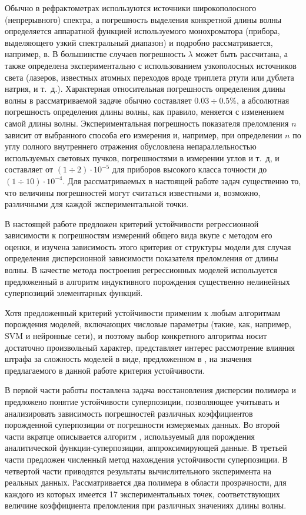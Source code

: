 \documentclass[11pt,a4paper]{article}
\theoremstyle{definition}
\begin{document}
Обычно в рефрактометрах используются источники широкополосного (непрерывного)
спектра, а погрешность выделения конкретной длины волны определяется аппаратной
функцией используемого монохроматора (прибора, выделяющего узкий спектральный
диапазон) и подробно рассматривается, например, в\cite{Malishev79,Zaidel72}.
В большинстве случаев погрешность $\lambda$ может быть рассчитана, а также
определена экспериментально с использованием узкополосных источников света
(лазеров, известных атомных переходов вроде триплета ртути или дублета натрия,
и т.~д.). Характерная относительная погрешность определения длины волны в
рассматриваемой задаче обычно составляет $0.03 \div 0.5\%$, а 
абсолютная погрешность определения длины волны, как правило, меняется с
изменением самой длины волны. Экспериментальная погрешность показателя
преломления $n$ зависит от выбранного способа его измерения и, например,
при определении $n$ по углу полного внутреннего отражения обусловлена
непараллельностью используемых световых пучков, погрешностями в измерении углов
и т.~д, и составляет от $(1 \div 2) \cdot 10^{-5}$ для приборов высокого класса
точности до $(1 \div 10) \cdot 10^{-4}$. Для рассматриваемых в настоящей работе
задач существенно то, что величины погрешностей могут считаться известными и,
возможно, различными для каждой экспериментальной точки.

В настоящей работе предложен критерий устойчивости регрессионной зависимости
к погрешностям измерений общего вида вкупе с методом его оценки, и изучена
зависимость этого критерия от структуры модели для случая определения
дисперсионной зависимости показателя преломления от длины волны. В качестве
метода построения регрессионных моделей используется предложенный в
\cite{Rudoy13} алгоритм индуктивного порождения существенно нелинейных
суперпозиций элементарных функций.

Хотя предложенный критерий устойчивости применим к любым алгоритмам порождения
моделей, включающих числовые параметры (такие, как, например, SVM и
нейронные сети), и поэтому выбор конкретного
алгоритма носит достаточно произвольный характер, представляет интерес
рассмотрение влияния штрафа за сложность моделей в виде, предложенном в \cite{Rudoy13},
на значения предлагаемого в данной работе критерия устойчивости.

В первой части работы поставлена задача восстановления дисперсии полимера и
предложено понятие устойчивости суперпозиции, позволяющее учитывать и анализировать
зависимость погрешностей различных коэффициентов порожденной суперпозиции от
погрешности измеряемых данных.
Во второй части вкратце описывается алгоритм \cite{Rudoy13},
используемый для порождения аналитической функции-суперпозиции, аппроксимирующей
данные. В третьей части предложен численный метод нахождения устойчивости
суперпозиции. В четвертой части приводятся результаты вычислительного
эксперимента на реальных данных. Рассматривается два полимера в области прозрачности,
для каждого из которых имеется 17 экспериментальных точек,
соответствующих величине коэффициента преломления при различных значениях длины волны.
\end{document}

